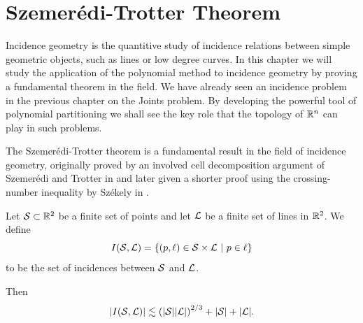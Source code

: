 \chapter{Szemerédi-Trotter Theorem \label{chap:trotter}}


Incidence geometry is the quantitive study of incidence relations between simple geometric objects, such as lines or low degree curves. 
In this chapter we will study the application of the polynomial method to incidence geometry by proving a fundamental theorem in the field.
We have already seen an incidence problem in the previous chapter on the Joints problem. 
By developing the powerful tool of polynomial partitioning we shall see the key role that the topology of $\mathbb R^n$ can play in such problems.


The Szemerédi-Trotter theorem is a fundamental result in the field of incidence geometry, originally proved by an involved cell decomposition argument
of Szemerédi and Trotter in \cite{szemeredi1983extremal} and later given a shorter proof using the crossing-number inequality by Székely in \cite{szekely1997crossing}. 
\begin{theorem}     \label{thm:S-T}
    Let $\mathcal S \subset\mathbb R^2$ be a finite set of points and
    let $\mathcal L$ be a finite set of lines in $\mathbb R^2$. We define 
    \[I(\ES,\LL) = \{(p, \ell) \in \ES \times \LL \ | \ p \in \ell\}\] 
    to be the set of incidences between $\mathcal S$ and $\mathcal L$. 
   
    Then
    \[
        |I(\mathcal S, \mathcal L)| \lesssim \left(|\mathcal S||\mathcal L|\right)^{2/3} + |\mathcal S| + |\mathcal L|.
    \]
\end{theorem}

